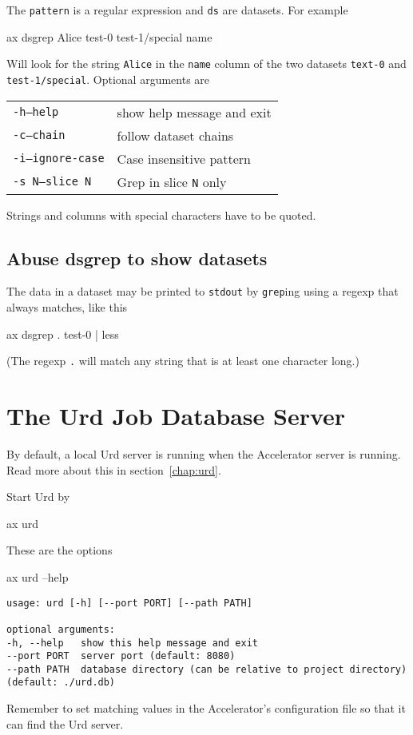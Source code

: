 The \texttt{pattern} is a regular expression and \texttt{ds} are
datasets.  For example
\begin{shell}
ax dsgrep Alice test-0 test-1/special name
\end{shell}
Will look for the string \texttt{Alice} in the \texttt{name} column of
the two datasets \texttt{text-0} and \texttt{test-1/special}.
Optional arguments are
\begin{snugshade}
  \begin{tabular}{p{4cm}p{9cm}}
      \texttt{-h}\hspace{3cm}\texttt{---help} & show help message and exit\\[4ex]
      \texttt{-c}\hspace{3cm}\texttt{---chain} & follow dataset chains\\[4ex]
      \texttt{-i}\hspace{3cm}\texttt{---ignore-case} & Case insensitive pattern\\[4ex]
      \texttt{-s N}\hspace{3cm}\texttt{---slice N} & Grep in slice \texttt{N} only\\
  \end{tabular}
\end{snugshade}
Strings and columns with special characters have to be quoted.



\subsection{Abuse dsgrep to show datasets}
The data in a dataset may be printed to \texttt{stdout} by
\texttt{grep}ing using a regexp that always matches, like this
\begin{shell}
ax dsgrep . test-0 | less
\end{shell}
(The regexp \texttt{.} will match any string that is at least one character long.)




\section{The Urd Job Database Server}
By default, a local Urd server is running when the Accelerator server
is running.  Read more about this in section~\ref{chap:urd}.

Start Urd by
\begin{shell}
ax urd
\end{shell}
These are the options
\begin{shell}
ax urd --help
\end{shell}
\begin{snugshade}
\begin{verbatim}
usage: urd [-h] [--port PORT] [--path PATH]

optional arguments:
-h, --help   show this help message and exit
--port PORT  server port (default: 8080)
--path PATH  database directory (can be relative to project directory)
(default: ./urd.db)
\end{verbatim}
\end{snugshade}
Remember to set matching values in the Accelerator's configuration
file so that it can find the Urd server.


